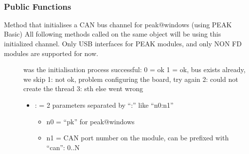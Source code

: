 \documentclass[a4paper,10pt,english]{sphinxmanual}
\begin{document}
\begin{fulllineitems}
\label{\detokenize{vendors/peak:_CPPv49PKCanScan}}%
\pysigstartmultiline
{}%
\pysigstopmultiline~\subsubsection*{Public Functions}

\begin{fulllineitems}
\label{\detokenize{vendors/peak:_CPPv4N9PKCanScan9createBusEK6stringK6string}}%
\pysigstartmultiline
{}%
\pysigstopmultiline
Method that initialises a CAN bus channel for peak@windows (using PEAK Basic) All following methods called on the same object will be using this initialized channel. Only USB interfaces for PEAK modules, and only NON FD modules are supported for now.

\begin{description}
\item[{}] \leavevmode
was the initialisation process successful: 0 = ok 1 = ok, bus exists already, we skip \sphinxhyphen{}1: not ok, problem configuring the board, try again \sphinxhyphen{}2: could not create the thread \sphinxhyphen{}3: sth else went wrong 

\item[{}] \leavevmode\begin{itemize}
\item {} 
: = 2 parameters separated by “:” like “n0:n1”\begin{itemize}
\item {} 
n0 = “pk” for peak@windows

\item {} 
n1 = CAN port number on the module, can be prefixed with “can”: 0..N


\end{itemize}
\end{itemize}
\end{description}
\end{fulllineitems}
\end{fulllineitems}
\end{document}
